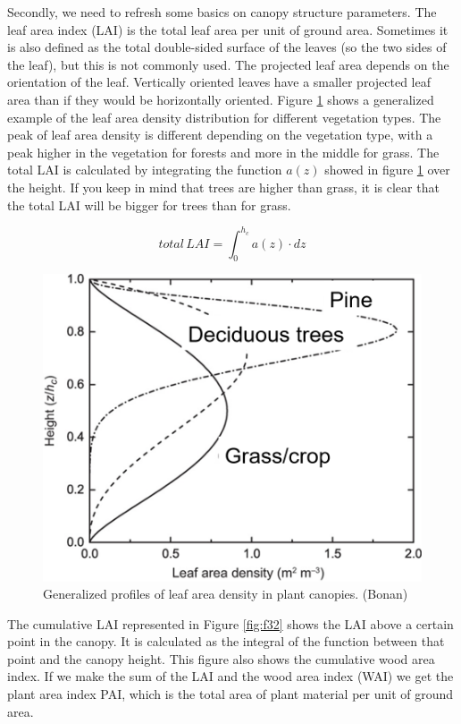 \documentclass[12pt,oneside]{book}
\begin{document}
Secondly, we need to refresh some basics on canopy structure parameters.
The leaf area index (LAI) is the total leaf area per unit of ground
area. Sometimes it is also defined as the total double-sided surface of
the leaves (so the two sides of the leaf), but this is not commonly
used. The projected leaf area depends on the orientation of the leaf.
Vertically oriented leaves have a smaller projected leaf area than if
they would be horizontally oriented. Figure \ref{fig:f31} shows a
generalized example of the leaf area density distribution for different
vegetation types. The peak of leaf area density is different depending
on the vegetation type, with a peak higher in the vegetation for forests
and more in the middle for grass. The total LAI is calculated by
integrating the function \(a(z)\) showed in figure \ref{fig:f31} over
the height. If you keep in mind that trees are higher than grass, it is
clear that the total LAI will be bigger for trees than for grass.

\[
total \, LAI = \int_0^{h_c}a(z) \cdot dz
\]

\begin{figure}

{\centering \includegraphics[width=0.8\linewidth]{figures/chap3/f31_LAD} 

}

\caption{Generalized profiles of leaf area density in plant canopies. (Bonan)}\label{fig:f31}
\end{figure}

The cumulative LAI represented in Figure \ref{fig:f32} shows the LAI
above a certain point in the canopy. It is calculated as the integral of
the function between that point and the canopy height. This figure also
shows the cumulative wood area index. If we make the sum of the LAI and
the wood area index (WAI) we get the plant area index PAI, which is the
total area of plant material per unit of ground area.
\end{document}
